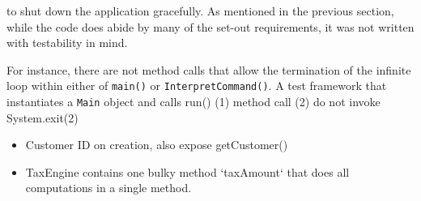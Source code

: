 to shut down the application gracefully. As mentioned in the previous section, while the code does abide by many of the set-out requirements, it was not written with testability in mind. 
\par 
For instance, there are not method calls that allow the termination of the infinite loop within either of \lstinline{main()} or \lstinline{InterpretCommand()}. A test framework that instantiates a \lstinline{Main} object and calls run() 
(1) method call 
(2) do not invoke System.exit(2) 

\begin{itemize}
	 \item Customer ID on creation, also expose getCustomer() 


	 \item TaxEngine contains one bulky method `taxAmount` that does all computations in a single method. 

\end{itemize}


